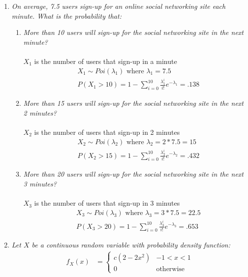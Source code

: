 \documentclass{article} %
\begin{document}
\thispagestyle{fancy} %

\begin{enumerate}
	
	\item \textit{On average, 7.5 users sign-up for an online social networking site each minute. What is the probability that:}
	\begin{enumerate}
		\item \textit{More than 10 users will sign-up for the social networking site in the next minute?}\\
		\\
		$X_1$ is the number of users that sign-up in a minute
		\begin{align*}
		&X_1 \sim Poi(\lambda_1) \text{ where } \lambda_1 = 7.5\\
		&P(X_1 > 10) = 1 - \sum_{i=0}^{10} \frac{\lambda_1^i}{i!}e^{-\lambda_1} = .138
		\end{align*}
		
		\item \textit{More than 15 users will sign-up for the social networking site in the next 2 minutes?}\\
		\\
		$X_2$ is the number of users that sign-up in 2 minutes
		\begin{align*}
		&X_2 \sim Poi(\lambda_2) \text{ where } \lambda_2 = 2 * 7.5 = 15\\
		&P(X_2 > 15) = 1 - \sum_{i=0}^{10} \frac{\lambda_2^i}{i!}e^{-\lambda_2} = .432
		\end{align*}
		
		\item \textit{More than 20 users will sign-up for the social networking site in the next 3 minutes?}\\
		\\
		$X_3$ is the number of users that sign-up in 3 minutes
		\begin{align*}
		&X_3 \sim Poi(\lambda_3) \text{ where } \lambda_3 = 3 * 7.5 = 22.5\\
		&P(X_3 > 20) = 1 - \sum_{i=0}^{10} \frac{\lambda_3^i}{i!}e^{-\lambda_3} = .653
		\end{align*}
	
	\end{enumerate}	
	
	\item \textit{Let $X$ be a continuous random variable with probability density function:}
	\begin{align*}
		f_X(x) &= 
			\begin{cases}
			c(2 - 2x^2) &-1 < x < 1\\
			0 &\text{otherwise}
			\end{cases}
	\end{align*}
		

\end{enumerate}
\end{document}
